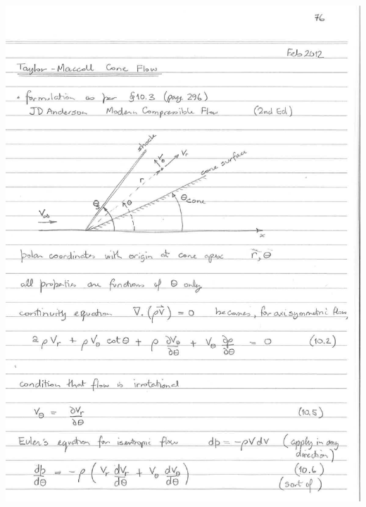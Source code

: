 \documentclass[10pt,a4paper]{article}
\begin{document}
\begin{center}
\includegraphics[width=\textwidth]{../figs/pj-workbook-page-76.png}
\end{center}
\end{document}
